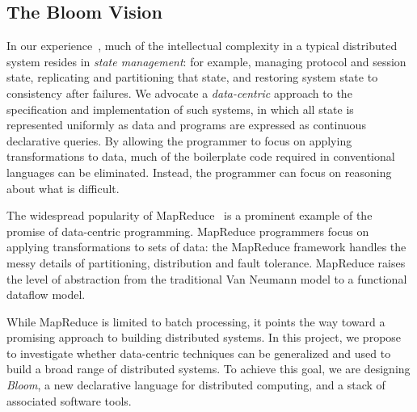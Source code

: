 \subsection{The Bloom Vision}
In our experience~\cite{boom-eurosys, netdb}, much of the intellectual
complexity in a typical distributed system resides in \emph{state
  management}: for example, managing protocol and session state, replicating and
  partitioning that state, and restoring system state to consistency after
  failures. 
We advocate a {\em data-centric\/} approach to the specification and implementation 
of such systems, in which all state is represented uniformly as data and programs
are expressed as continuous declarative queries.
By allowing the programmer to focus on applying transformations to
data, much of the boilerplate code required in conventional languages can be
eliminated. Instead, the programmer can focus on reasoning about what is
difficult.

The widespread popularity of MapReduce~\cite{mapreduce-osdi} is a prominent
example of the promise of data-centric programming. MapReduce programmers focus
on applying transformations to sets of data: the MapReduce framework handles the
messy details of partitioning, distribution and fault tolerance. MapReduce
raises the level of abstraction from the traditional Van Neumann model to a
functional dataflow model.

While MapReduce is limited to batch processing, it points the way toward a
promising approach to building distributed systems. In this project, we propose
to investigate whether data-centric techniques can be generalized and used to
build a broad range of distributed systems. To achieve this goal, we are
designing \emph{Bloom}, a new declarative language for distributed computing,
and a stack of associated software tools.
